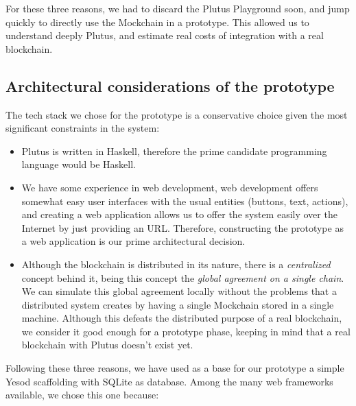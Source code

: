 \documentclass{article}
\begin{document}
For these three reasons, we had to discard the Plutus Playground soon, and jump quickly to directly use the Mockchain in a prototype. This allowed us to understand deeply Plutus, and estimate real costs of integration with a real blockchain.

\subsection{Architectural considerations of the prototype}
The tech stack we chose for the prototype is a conservative choice given the most significant constraints in the system:

\begin{itemize}
  \item Plutus is written in Haskell, therefore the prime candidate programming language would be Haskell.
  \item We have some experience in web development, web development offers somewhat easy user interfaces with the usual entities (buttons, text, actions), and creating a web application allows us to offer the system easily over the Internet by just providing an URL. Therefore, constructing the prototype as a web application is our prime architectural decision.
  \item Although the blockchain is distributed in its nature, there is a \emph{centralized} concept behind it, being this concept the \emph{global agreement on a single chain}. We can simulate this global agreement locally without the problems that a distributed system creates by having a single Mockchain stored in a single machine. Although this defeats the distributed purpose of a real blockchain, we consider it good enough for a prototype phase, keeping in mind that a real blockchain with Plutus doesn't exist yet.
\end{itemize}

Following these three reasons, we have used as a base for our prototype a simple Yesod scaffolding with SQLite as database. Among the many web frameworks available, we chose this one because:
\end{document}

